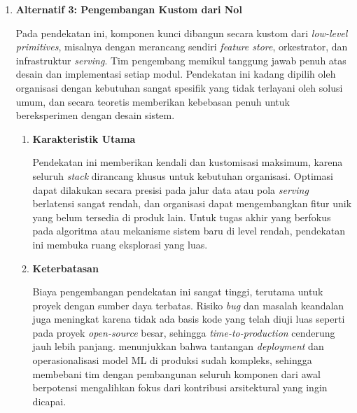 \begin{enumerate}
\begin{enumerate}[label=\alph*)]
        \vspace{0.5em}
    \end{enumerate}

    \item \textbf{Alternatif 3: Pengembangan Kustom dari Nol}

    Pada pendekatan ini, komponen kunci dibangun secara kustom dari \textit{low-level primitives}, misalnya dengan merancang sendiri \textit{feature store}, orkestrator, dan infrastruktur \textit{serving}. Tim pengembang memikul tanggung jawab penuh atas desain dan implementasi setiap modul. Pendekatan ini kadang dipilih oleh organisasi dengan kebutuhan sangat spesifik yang tidak terlayani oleh solusi umum, dan secara teoretis memberikan kebebasan penuh untuk bereksperimen dengan desain sistem.

    \vspace{0.5em}
    \begin{enumerate}[label=\alph*)]
        \item \textbf{Karakteristik Utama}

        Pendekatan ini memberikan kendali dan kustomisasi maksimum, karena seluruh \textit{stack} dirancang khusus untuk kebutuhan organisasi. Optimasi dapat dilakukan secara presisi pada jalur data atau pola \textit{serving} berlatensi sangat rendah, dan organisasi dapat mengembangkan fitur unik yang belum tersedia di produk lain. Untuk tugas akhir yang berfokus pada algoritma atau mekanisme sistem baru di level rendah, pendekatan ini membuka ruang eksplorasi yang luas.

        \vspace{0.5em}
        \item \textbf{Keterbatasan}

        Biaya pengembangan pendekatan ini sangat tinggi, terutama untuk proyek dengan sumber daya terbatas. Risiko \textit{bug} dan masalah keandalan juga meningkat karena tidak ada basis kode yang telah diuji luas seperti pada proyek \textit{open-source} besar, sehingga \textit{time-to-production} cenderung jauh lebih panjang. \textcite{paleyes2022challenges} menunjukkan bahwa tantangan \textit{deployment} dan operasionalisasi model ML di produksi sudah kompleks, sehingga membebani tim dengan pembangunan seluruh komponen dari awal berpotensi mengalihkan fokus dari kontribusi arsitektural yang ingin dicapai.
    
        \vspace{0.5em}
    \end{enumerate}


\end{enumerate}
